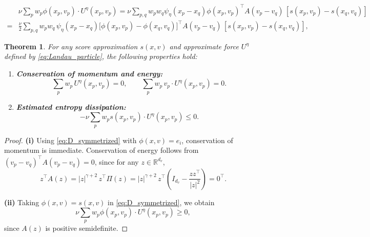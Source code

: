 \documentclass[10pt,a4paper]{amsart}
\newtheorem{theorem}{Theorem}
\newcommand{\R}{\mathbb{R}}
\begin{document}
\begin{align}
&\nu\sum_p w_p  \phi (x_p,v_p)\cdot U^{\eta}(x_p,v_p)=\nu\sum_{p,q} w_p w_q \psi_\eta(x_p - x_q)  \phi(x_p,v_p)^\top A(v_p-v_q)\,[s(x_p,v_p) - s(x_q,v_q)]\\
=&\frac{\nu}{2}\sum_{p,q} w_p w_q \, \psi_\eta(x_p - x_q) \big[\phi(x_p,v_p) - \phi(x_q,v_q)\big]^\top A(v_p-v_q)\,[s(x_p,v_p) - s(x_q,v_q)],\label{eq:D_symmetrized}
\end{align}

\begin{theorem}
\label{thm:collision}
For any score approximation $s(x,v)$ and approximate force $U^\eta$ defined by \eqref{eq:Landau_particle}, the following properties hold:
\begin{enumerate}
\item[(i)] \textbf{Conservation of momentum and energy:}
\begin{equation}
\sum_p w_p \, U^{\eta}(x_p,v_p) = 0, \qquad \sum_p w_p \, v_p \cdot U^{\eta}(x_p,v_p) = 0.
\end{equation}
\item[(ii)] \textbf{Estimated entropy dissipation:} 
\begin{equation}
-\nu\sum_p w_p s (x_p,v_p)\cdot U^{\eta}(x_p,v_p)\leq 0.
\end{equation}
\end{enumerate}
\end{theorem}

\begin{proof}
\textbf{(i)} Using \eqref{eq:D_symmetrized} with $\phi(x,v) = e_i$, conservation of momentum is immediate. Conservation of energy follows from $(v_p - v_q)^\top A(v_p - v_q) = 0$, since for any $z \in \R^{d_v}$,
\begin{equation}
\label{eq:zA_zero}
z^\top A(z) = |z|^{\gamma+2}\, z^\top \Pi(z) = |z|^{\gamma+2}\, z^\top\!\left(I_{d_v} - \frac{zz^\top}{|z|^2}\right) = 0^\top.
\end{equation}

\textbf{(ii)} Taking $\phi(x,v)=s(x,v)$ in \eqref{eq:D_symmetrized}, we obtain
\[
\nu\sum_p w_p  \phi (x_p,v_p)\cdot U^{\eta}(x_p,v_p)\geq 0,
\]
since $A(z)$ is positive semidefinite. 
\end{proof}
\end{document}
